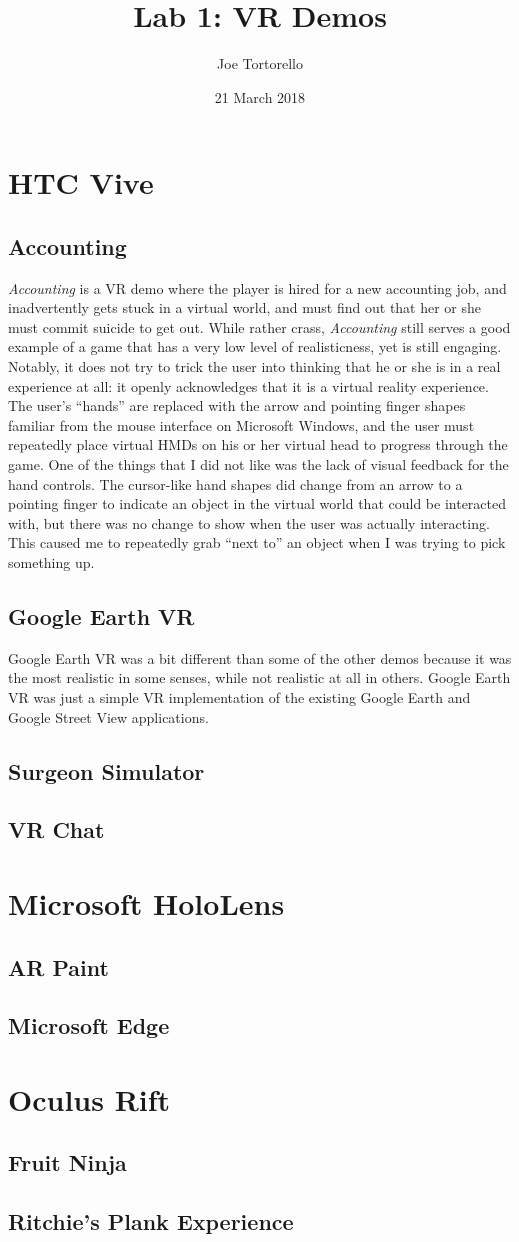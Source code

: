 \documentclass[11pt]{article}
\title{Lab 1: VR Demos}
\author{Joe Tortorello}
\date{21 March 2018}
\begin{document}
\maketitle
\section{HTC Vive}
\subsection{Accounting}
\textit{Accounting} is a VR demo where the player is hired for a new accounting job, and inadvertently gets stuck in a virtual world, and must find out that her or she must commit suicide to get out. While rather crass, \textit{Accounting} still serves a good example of a game that has a very low level of realisticness, yet is still engaging. Notably, it does not try to trick the user into thinking that he or she is in a real experience at all: it openly acknowledges that it is a virtual reality experience. The user's ``hands'' are replaced with the arrow and pointing finger shapes familiar from the mouse interface on Microsoft Windows, and the user must repeatedly place virtual HMDs on his or her virtual head to progress through the game. One of the things that I did not like was the lack of visual feedback for the hand controls. The cursor-like hand shapes did change from an arrow to a pointing finger to indicate an object in the virtual world that could be interacted with, but there was no change to show when the user was actually interacting. This caused me to repeatedly grab ``next to'' an object when I was trying to pick something up.
\subsection{Google Earth VR}
Google Earth VR was a bit different than some of the other demos because it was the most realistic in some senses, while not realistic at all in others. Google Earth VR was just a simple VR implementation of the existing Google Earth and Google Street View applications.
\subsection{Surgeon Simulator}
\subsection{VR Chat}
\section{Microsoft HoloLens}
\subsection{AR Paint}
\subsection{Microsoft Edge}
\section{Oculus Rift}
\subsection{Fruit Ninja}
\subsection{Ritchie's Plank Experience}
\end{document}
